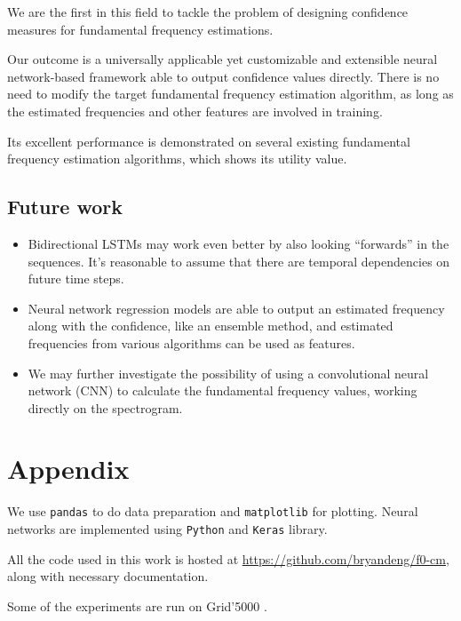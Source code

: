 \documentclass[11pt,a4paper]{report}
\begin{document}
We are the first in this field to tackle the problem of designing confidence measures for fundamental frequency estimations.

Our outcome is a universally applicable yet customizable and extensible neural network-based framework able to output confidence values directly.
There is no need to modify the target fundamental frequency estimation algorithm, as long as the estimated frequencies and other features are involved in training.

Its excellent performance is demonstrated on several existing fundamental frequency estimation algorithms, which shows its utility value.

\section*{Future work}

\begin{itemize}
  \item Bidirectional LSTMs may work even better by also looking \enquote{forwards} in the sequences.
    It's reasonable to assume that there are temporal dependencies on future time steps.
  \item Neural network regression models are able to output an estimated frequency along with the confidence, like an ensemble method, and estimated frequencies from various algorithms can be used as features.
  \item We may further investigate the possibility of using a convolutional neural network (CNN) to calculate the fundamental frequency values, working directly on the spectrogram.
\end{itemize}

\appendix

\chapter{Appendix}

We use \texttt{pandas} \parencite{mckinney2010data} to do data preparation and \texttt{matplotlib} \parencite{hunter2007matplotlib} for plotting.
Neural networks are implemented using \texttt{Python} and \texttt{Keras} \parencite{chollet2015keras} library.

\bigskip

All the code used in this work is hosted at \url{https://github.com/bryandeng/f0-cm}, along with necessary documentation.

\bigskip

Some of the experiments are run on Grid'5000 \parencite{balouek2012adding}.

\printbibliography
\end{document}

